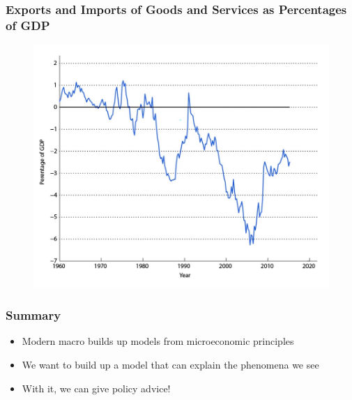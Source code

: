 \documentclass{beamer}
\begin{document}
\begin{frame}
\frametitle[alignment=center]{Exports and Imports of Goods and Services as Percentages of GDP}
\begin{figure}
\includegraphics[scale=0.6]{Figures/W_Fig_1pt17.png}
\end{figure}
\end{frame}

\begin{frame}
\frametitle[alignment=center]{Summary}
\begin{itemize}
\item Modern macro builds up models from microeconomic principles
\bigskip
\item We want to build up a model that can explain the phenomena we see
\bigskip
\item With it, we can give policy advice!

\end{itemize}
\end{frame}
\end{document}
